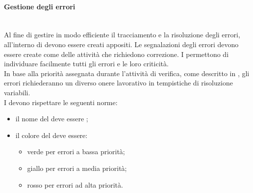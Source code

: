 \paragraph{Gestione degli errori} \mbox{} \\
Al fine di gestire in modo efficiente il tracciamento e la risoluzione degli errori, all'interno di  devono essere creati  appositi.
Le segnalazioni degli errori devono essere create come  delle attività che richiedono correzione. I  permettono di individuare facilmente tutti gli errori e le loro criticità.\\
In base alla priorità assegnata durante l'attività di verifica, come descritto in \PianoDiQualifica, gli errori richiederanno un diverso onere lavorativo in tempistiche di risoluzione variabili.\\
I  devono rispettare le seguenti norme:
\begin{itemize}
	\item il nome del  deve essere ;
	\item il colore del  deve essere:
	\begin{itemize}
		\item verde per errori a bassa priorità;
		\item giallo per errori a media priorità;
		\item rosso per errori ad alta priorità.
	\end{itemize}
\end{itemize}


















